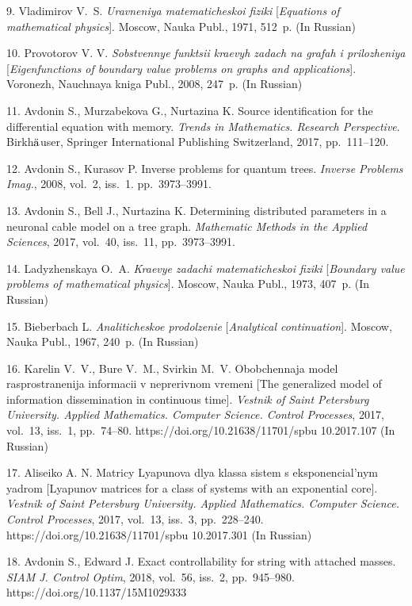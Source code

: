 {9. Vladimirov V.~S. \textit{Uravneniya matematicheskoi fiziki}
[\textit{Equations of mathematical physics}]. Moscow, Nauka Publ.,
1971, 512~p. (In Russian)

10. Provotorov V. V. \textit{Sobstvennye funktsii kraevyh zadach
na grafah i prilozheniya} [\textit{Eigenfunctions of boundary
value problems on graphs and applications}]. Voronezh, Nauchnaya
kniga Publ., 2008, 247~p. (In Russian)

11. Avdonin S., Murzabekova G., Nurtazina K. Source identification
for the differential equation with memory. \textit{Trends in
Mathematics. Research Perspective}. Birkh$\ddot {\rm a}$user,
Springer International Publishing Switzerland, 2017, pp.~111--120.

12. Avdonin S., Kurasov P. Inverse problems for quantum trees.
\textit{Inverse Problems Imag.}, 2008, vol.~2, iss.~1.
pp.~3973--3991.

13. Avdonin S., Bell J., Nurtazina K. Determining distributed
parameters in a neuronal cable model on a tree graph.
\textit{Mathematic Methods in the Applied Sciences}, 2017,
vol.~40, iss.~11, pp.~3973--3991.

14. Ladyzhenskaya O.~A. \textit{Kraevye zadachi matematicheskoi
fiziki} [\textit{Boundary value problems of mathematical
physics}]. Moscow, Nauka Publ., 1973, 407~p. (In Russian)

15. Bieberbach L. \textit{Analiticheskoe prodolzenie
}[\textit{Analytical continuation}]. Moscow, Nauka Publ., 1967,
240~p. (In Russian)

16. Karelin V.~V., Bure V.~M., Svirkin M.~V. Obobchennaja model
rasprostranenija informacii v neprerivnom vremeni [The generalized
model of information dissemination in continuous time].
\textit{Vestnik of Saint Petersburg University. Applied
Mathematics. Computer Science. Control Processes}, 2017, vol.~13,
iss.~1, pp.~74--80. https://doi.org/10.21638/11701/spbu
10.2017.107 (In Russian)


17. Aliseiko A. N. Matricy Lyapunova dlya klassa sistem s
eksponencial'nym yadrom [Lyapunov matrices for a class of systems
with an exponential core]. \textit{Vestnik of Saint Petersburg
Universi\-ty. Applied Mathematics. Computer Science. Control
Processes}, 2017, vol.~13, iss.~3, pp.~228--240.
https://doi.org/10.21638/11701/spbu 10.2017.301 (In Russian)


18. Avdonin S., Edward J.  Exact controllability for string with
attached masses. \textit{SIAM J. Control Optim}, 2018, vol.~56,
iss.~2, pp.~945--980. https://doi.org/10.1137/15M1029333

}
